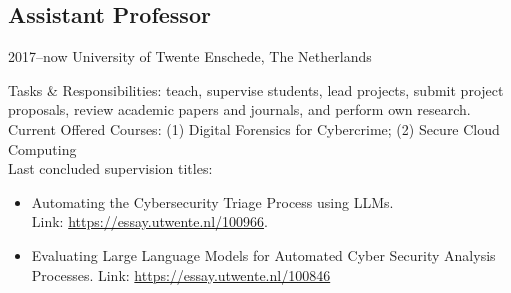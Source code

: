 \documentclass[print]{styles/friggeri-cv-mac} %
\begin{document}
\subsection{Assistant Professor}\vspace{-5pt}
\begin{entrylist}
	\entry
	{2017--now}
	{University of Twente}
	{Enschede, The Netherlands}
	{Tasks \& Responsibilities: teach, supervise students, lead projects, submit project proposals, review academic papers and journals, and perform own research.\\
	Current Offered Courses: (1) Digital Forensics for Cybercrime; (2) Secure Cloud Computing\\
	Last concluded supervision titles: 
	\begin{itemize}
		\item Automating the Cybersecurity Triage Process using LLMs.\\
		Link: \href{https://essay.utwente.nl/100966}{https://essay.utwente.nl/100966}.
		\item Evaluating Large Language Models for Automated Cyber Security Analysis Processes.
		Link: \href{https://essay.utwente.nl/100846}{https://essay.utwente.nl/100846}
	\end{itemize}
	} 
	
\end{entrylist}

\end{document}
